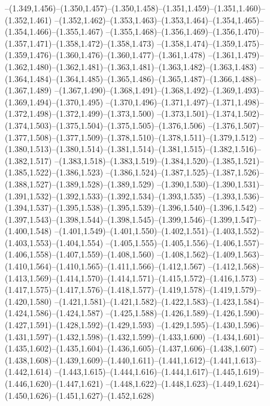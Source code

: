   --(1.349,1.456)--(1.350,1.457)--(1.350,1.458)--(1.351,1.459)--(1.351,1.460)--(1.352,1.461)%
  --(1.352,1.462)--(1.353,1.463)--(1.353,1.464)--(1.354,1.465)--(1.354,1.466)--(1.355,1.467)%
  --(1.355,1.468)--(1.356,1.469)--(1.356,1.470)--(1.357,1.471)--(1.358,1.472)--(1.358,1.473)%
  --(1.358,1.474)--(1.359,1.475)--(1.359,1.476)--(1.360,1.476)--(1.360,1.477)--(1.361,1.478)%
  --(1.361,1.479)--(1.362,1.480)--(1.362,1.481)--(1.363,1.481)--(1.363,1.482)--(1.363,1.483)%
  --(1.364,1.484)--(1.364,1.485)--(1.365,1.486)--(1.365,1.487)--(1.366,1.488)--(1.367,1.489)%
  --(1.367,1.490)--(1.368,1.491)--(1.368,1.492)--(1.369,1.493)--(1.369,1.494)--(1.370,1.495)%
  --(1.370,1.496)--(1.371,1.497)--(1.371,1.498)--(1.372,1.498)--(1.372,1.499)--(1.373,1.500)%
  --(1.373,1.501)--(1.374,1.502)--(1.374,1.503)--(1.375,1.504)--(1.375,1.505)--(1.376,1.506)%
  --(1.376,1.507)--(1.377,1.508)--(1.377,1.509)--(1.378,1.510)--(1.378,1.511)--(1.379,1.512)%
  --(1.380,1.513)--(1.380,1.514)--(1.381,1.514)--(1.381,1.515)--(1.382,1.516)--(1.382,1.517)%
  --(1.383,1.518)--(1.383,1.519)--(1.384,1.520)--(1.385,1.521)--(1.385,1.522)--(1.386,1.523)%
  --(1.386,1.524)--(1.387,1.525)--(1.387,1.526)--(1.388,1.527)--(1.389,1.528)--(1.389,1.529)%
  --(1.390,1.530)--(1.390,1.531)--(1.391,1.532)--(1.392,1.533)--(1.392,1.534)--(1.393,1.535)%
  --(1.393,1.536)--(1.394,1.537)--(1.395,1.538)--(1.395,1.539)--(1.396,1.540)--(1.396,1.542)%
  --(1.397,1.543)--(1.398,1.544)--(1.398,1.545)--(1.399,1.546)--(1.399,1.547)--(1.400,1.548)%
  --(1.401,1.549)--(1.401,1.550)--(1.402,1.551)--(1.403,1.552)--(1.403,1.553)--(1.404,1.554)%
  --(1.405,1.555)--(1.405,1.556)--(1.406,1.557)--(1.406,1.558)--(1.407,1.559)--(1.408,1.560)%
  --(1.408,1.562)--(1.409,1.563)--(1.410,1.564)--(1.410,1.565)--(1.411,1.566)--(1.412,1.567)%
  --(1.412,1.568)--(1.413,1.569)--(1.414,1.570)--(1.414,1.571)--(1.415,1.572)--(1.416,1.573)%
  --(1.417,1.575)--(1.417,1.576)--(1.418,1.577)--(1.419,1.578)--(1.419,1.579)--(1.420,1.580)%
  --(1.421,1.581)--(1.421,1.582)--(1.422,1.583)--(1.423,1.584)--(1.424,1.586)--(1.424,1.587)%
  --(1.425,1.588)--(1.426,1.589)--(1.426,1.590)--(1.427,1.591)--(1.428,1.592)--(1.429,1.593)%
  --(1.429,1.595)--(1.430,1.596)--(1.431,1.597)--(1.432,1.598)--(1.432,1.599)--(1.433,1.600)%
  --(1.434,1.601)--(1.435,1.602)--(1.435,1.604)--(1.436,1.605)--(1.437,1.606)--(1.438,1.607)%
  --(1.438,1.608)--(1.439,1.609)--(1.440,1.611)--(1.441,1.612)--(1.441,1.613)--(1.442,1.614)%
  --(1.443,1.615)--(1.444,1.616)--(1.444,1.617)--(1.445,1.619)--(1.446,1.620)--(1.447,1.621)%
  --(1.448,1.622)--(1.448,1.623)--(1.449,1.624)--(1.450,1.626)--(1.451,1.627)--(1.452,1.628)%
